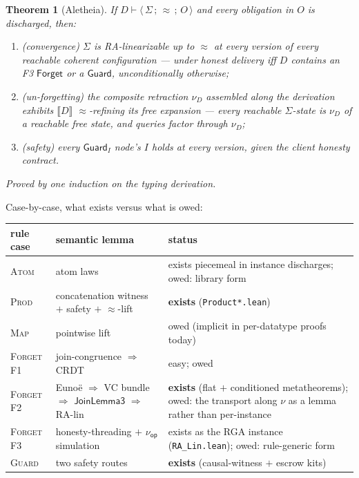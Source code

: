 \documentclass[11pt]{article}
\newtheorem{theorem}{Theorem}[section]
\newcommand{\lean}[1]{\texttt{#1}}
\newcommand{\eqobs}{\approx}
\newcommand{\Forget}{\mathsf{Forget}}
\newcommand{\Guard}{\mathsf{Guard}}
\newcommand{\nuop}{\nu_{\mathsf{op}}}
\newcommand{\judg}[3]{\langle\, #1 \,;\, #2 \,;\, #3 \,\rangle}
\newcommand{\RA}{\textsf{RA-lin}}
\begin{document}
\begin{theorem}[Aletheia]\label{thm:aletheia}
If $D \vdash \judg{\Sigma}{\eqobs}{O}$ and every obligation in $O$ is
discharged, then:
\begin{enumerate}[leftmargin=2em]
\item \emph{(convergence)} $\Sigma$ is RA-linearizable up to $\eqobs$ at
  every version of every reachable coherent configuration --- under honest
  delivery iff $D$ contains an F3 $\Forget$ or a $\Guard$, unconditionally
  otherwise;
\item \emph{(un-forgetting)} the composite retraction $\nu_D$ assembled
  along the derivation exhibits $\llbracket D \rrbracket$
  $\eqobs$-refining its free expansion --- every reachable $\Sigma$-state
  is $\nu_D$ of a reachable free state, and queries factor through
  $\nu_D$;
\item \emph{(safety)} every $\Guard_I$ node's $I$ holds at every version,
  given the client honesty contract.
\end{enumerate}
Proved by \emph{one induction on the typing derivation}.
\end{theorem}

Case-by-case, what exists versus what is owed:

\begin{center}
\begin{tabular}{@{}lp{2.6in}p{2.1in}@{}}
\toprule
rule case & semantic lemma & status \\
\midrule
\textsc{Atom} & atom laws
  & exists piecemeal in instance discharges; owed: library form \\
\textsc{Prod} & concatenation witness $+$ safety $+$ $\eqobs$-lift
  & \textbf{exists} (\lean{Product*.lean}) \\
\textsc{Map} & pointwise lift
  & owed (implicit in per-datatype proofs today) \\
\textsc{Forget} F1 & join-congruence $\Rightarrow$ CRDT & easy; owed \\
\textsc{Forget} F2 & Euno\"e $\Rightarrow$ VC bundle $\Rightarrow$
  $\mathsf{JoinLemma3}$ $\Rightarrow$ \RA
  & \textbf{exists} (flat $+$ conditioned metatheorems); owed: the
    transport along $\nu$ as a lemma rather than per-instance \\
\textsc{Forget} F3 & honesty-threading $+$ $\nuop$ simulation
  & exists as the RGA instance (\lean{RA\_Lin.lean}); owed: rule-generic
    form \\
\textsc{Guard} & two safety routes
  & \textbf{exists} (causal-witness $+$ escrow kits) \\
\bottomrule
\end{tabular}
\end{center}
\end{document}
